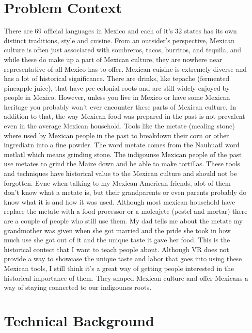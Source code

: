 \documentclass[12pt,twocolumn]{article}
\begin{document}
\section{Problem Context}
There are 69 official languages in Mexico and each of it’s 32 states has its own distinct traditions, style and cuisine. From an outsider’s perspective, Mexican culture is often just associated with sombreros, tacos, burritos, and tequila, and while these do make up a part of Mexican culture, they are nowhere near representative of all Mexico has to offer. Mexican cuisine is extremely diverse and has a lot of historical significance. There are drinks, like tepache (fermented pineapple juice), that have pre colonial roots and are still widely enjoyed by people in Mexico. However, unless you live in Mexico or have some Mexican heritage you probably won’t ever encounter these parts of Mexican culture. In addition to that, the way Mexican food was prepared in the past is not prevalent even in the average Mexican household. Tools like the metate (mealing stone) where used by Mexican people in the past to breakdown their corn or other ingrediatn into a fine powder. The word metate comes from the Nauhuatl word metlatl which means grinding stone. The indigounse Mexican people of the past use metates to grind the Maize down and be able to make tortillas. These tools and techniques have historical value to the Mexican culture and should not be forgotten. Evne when talking to my Mexican American friends, alot of them don’t know what a metate is, but their grandparents or even parents probably do know what it is and how it was used. Although most mexican household have replace the metate with a food processor or a molcajete (pestel and mortar) there are a couple of people who still use them. My dad tells me about the metate my grandmother was given when she got married and the pride she took in how much use she got out of it and the unique taste it gave her food. This is the historical contect that I want to teach people about. Although VR does not provide a way to showcase the unique taste and labor that goes into using these Mexican tools, I still think it’s a great way of getting people interested in the historical importance of them. They shaped Mexican culture and offer Mexicans a way of staying connected to our indigounes roots. 

\section{Technical Background}
\end{document}
